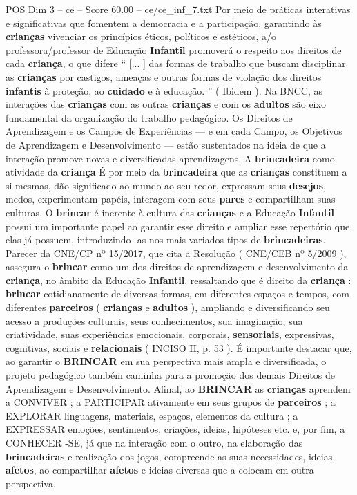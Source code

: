 \begin{textsample}{POS Dim 3 – ce – Score 60.00 – ce/ce\_inf\_7.txt}
Por meio de práticas interativas e significativas que fomentem a democracia e a participação, garantindo às \textbf{crianças} vivenciar os princípios éticos, políticos e estéticos, a/o professora/professor de Educação \textbf{Infantil} promoverá o respeito aos direitos de cada \textbf{criança}, o que difere “ [... ] das formas de trabalho que buscam disciplinar as \textbf{crianças} por castigos, ameaças e outras formas de violação dos direitos \textbf{infantis} à proteção, ao \textbf{cuidado} e à educação. ” ( Ibidem ).
Na BNCC, as interações das \textbf{crianças} com as outras \textbf{crianças} e com os \textbf{adultos} são eixo fundamental da organização do trabalho pedagógico.
Os Direitos de Aprendizagem e os Campos de Experiências — e em cada Campo, os Objetivos de Aprendizagem e Desenvolvimento — estão sustentados na ideia de que a interação promove novas e diversificadas aprendizagens.
A \textbf{brincadeira} como atividade da \textbf{criança} É por meio da \textbf{brincadeira} que as \textbf{crianças} constituem a si mesmas, dão significado ao mundo ao seu redor, expressam seus \textbf{desejos}, medos, experimentam papéis, interagem com seus \textbf{pares} e compartilham suas culturas.
O \textbf{brincar} é inerente à cultura das \textbf{crianças} e a Educação \textbf{Infantil} possui um importante papel ao garantir esse direito e ampliar esse repertório que elas já possuem, introduzindo -as nos mais variados tipos de \textbf{brincadeiras}.
Parecer da CNE/CP nº 15/2017, que cita a Resolução ( CNE/CEB nº 5/2009 ), assegura o \textbf{brincar} como um dos direitos de aprendizagem e desenvolvimento da \textbf{criança}, no âmbito da Educação \textbf{Infantil}, ressaltando que é direito da \textbf{criança} : \textbf{brincar} cotidianamente de diversas formas, em diferentes espaços e tempos, com diferentes \textbf{parceiros} ( \textbf{crianças} e \textbf{adultos} ), ampliando e diversificando seu acesso a produções culturais, seus conhecimentos, sua imaginação, sua criatividade, suas experiências emocionais, corporais, \textbf{sensoriais}, expressivas, cognitivas, sociais e \textbf{relacionais} ( INCISO II, p. 53 ).
É importante destacar que, ao garantir o \textbf{BRINCAR} em sua perspectiva mais ampla e diversificada, o projeto pedagógico também caminha para a promoção dos demais Direitos de Aprendizagem e Desenvolvimento.
Afinal, ao \textbf{BRINCAR} as \textbf{crianças} aprendem a CONVIVER ; a PARTICIPAR ativamente em seus grupos de \textbf{parceiros} ; a EXPLORAR linguagens, materiais, espaços, elementos da cultura ; a EXPRESSAR emoções, sentimentos, criações, ideias, hipóteses etc. e, por fim, a CONHECER -SE, já que na interação com o outro, na elaboração das \textbf{brincadeiras} e realização dos jogos, compreende as suas necessidades, ideias, \textbf{afetos}, ao compartilhar \textbf{afetos} e ideias diversas que a colocam em outra perspectiva.

\end{textsample}
